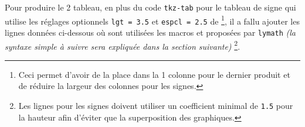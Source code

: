 \documentclass[12pt,a4paper]{article}
\begin{document}
\begin{center}
\end{center}


Pour produire le 2\ieme{} tableau, en plus du code \verb#tkz-tab# pour le tableau de signe qui utilise les réglages optionnels \verb#lgt = 3.5# et 
\verb#espcl = 2.5# de 
\footnote{
	Ceci permet d'avoir de la place dans la 1\iere{} colonne pour le dernier produit et de réduire la largeur des colonnes pour les signes.
},
il a fallu ajouter les lignes données ci-dessous où sont utilisées les macros  et  proposées par \verb+lymath+ \emph{(la syntaxe simple à suivre sera expliquée dans la section suivante)}
\footnote{
	Les lignes pour les signes doivent utiliser un coefficient minimal de \texttt{1.5} pour la hauteur afin d'éviter que la superposition des graphiques.
}.

\medskip

\begin{latexex-alone}
\end{latexex-alone}
\end{document}
